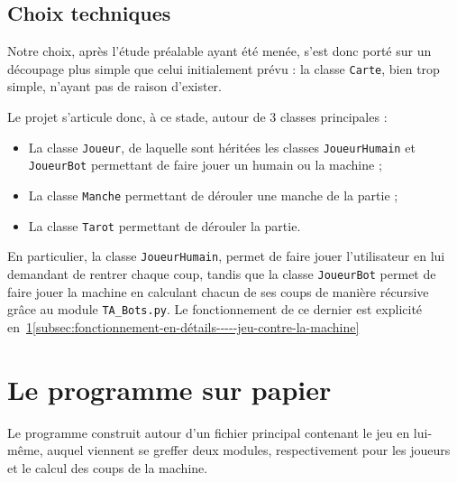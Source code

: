    \subsection{Choix techniques}\label{subsec:choix-techniques}
      Notre choix, après l'étude préalable ayant été menée, s'est donc porté sur un découpage plus simple que celui initialement prévu : la classe \texttt{Carte}, bien trop simple, n'ayant pas de raison d'exister.

      Le projet s'articule donc, à ce stade, autour de 3 classes principales :
      \begin{itemize}
         \item La classe \texttt{Joueur}, de laquelle sont héritées les classes \texttt{JoueurHumain} et \texttt{JoueurBot} permettant de faire jouer un humain ou la machine ;
         \item La classe \texttt{Manche} permettant de dérouler une manche de la partie ;
         \item La classe \texttt{Tarot} permettant de dérouler la partie.
      \end{itemize}

      En particulier, la classe \texttt{JoueurHumain}, permet de faire jouer l'utilisateur en lui demandant de rentrer chaque coup, tandis que la classe \texttt{JoueurBot} permet de faire jouer la machine en calculant chacun de ses coups de manière récursive grâce au module \texttt{TA\_Bots.py}.
      Le fonctionnement de ce dernier est explicité en~\ref{sec:le-programme-sur-papier}\ref{subsec:fonctionnement-en-détails-----jeu-contre-la-machine}


\section{Le programme sur papier}\label{sec:le-programme-sur-papier}
   Le programme construit autour d'un fichier principal contenant le jeu en lui-même, auquel viennent se greffer deux modules, respectivement pour les joueurs et le calcul des coups de la machine.

